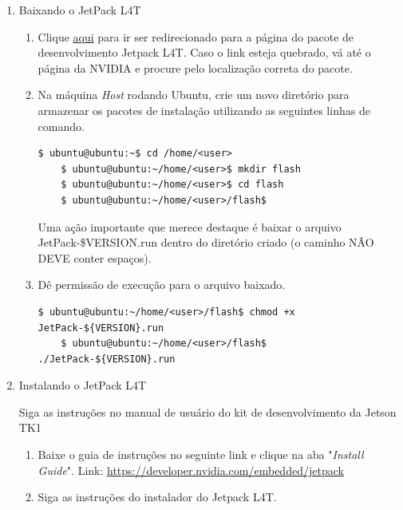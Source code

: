 \begin{enumerate}
  \item Baixando o JetPack L4T
    \begin{enumerate}
      \item Clique \href{http://docs.nvidia.com/jetpack-l4t/index.html#developertools/mobile/jetpack/jetpack_l4t/2.1/jetpack_l4t_install.htm}{aqui} para ir ser redirecionado para a página do pacote de desenvolvimento Jetpack L4T. Caso o link esteja quebrado, vá até o página da NVIDIA e procure pelo localização correta do pacote.  

      \item Na máquina \textit{Host} rodando Ubuntu, crie um novo diretório para armazenar os pacotes de instalação utilizando as seguintes linhas de comando.

      \begin{lstlisting}[basicstyle=\tiny]
	$ ubuntu@ubuntu:~$ cd /home/<user>
	$ ubuntu@ubuntu:~/home/<user>$ mkdir flash
	$ ubuntu@ubuntu:~/home/<user>$ cd flash
	$ ubuntu@ubuntu:~/home/<user>/flash$ 
      \end{lstlisting}

      Uma ação importante que merece destaque é baixar o arquivo JetPack-\${VERSION}.run dentro do diretório criado (o caminho NÃO DEVE conter espaços).

      \item Dê permissão de execução para o arquivo baixado. 
      \begin{lstlisting}[basicstyle=\tiny]
	$ ubuntu@ubuntu:~/home/<user>/flash$ chmod +x JetPack-${VERSION}.run
	$ ubuntu@ubuntu:~/home/<user>/flash$ ./JetPack-${VERSION}.run
      \end{lstlisting}


    \end{enumerate}
  \item Instalando o JetPack L4T

    Siga as instruções no manual de usuário do kit de desenvolvimento da Jetson TK1
    \begin{enumerate}
      \item Baixe o guia de instruções no seguinte link e clique na aba "\textit{Install Guide}". Link: \url{https://developer.nvidia.com/embedded/jetpack}
      \item Siga as instruções do instalador do Jetpack L4T.


\end{enumerate}
\end{enumerate}
